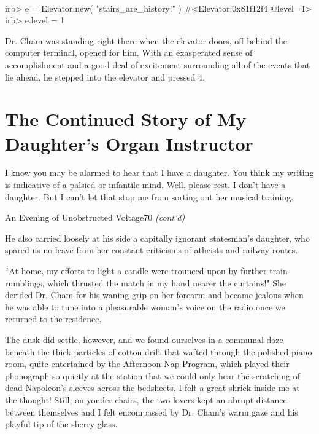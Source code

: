 \documentclass[12pt,twoside]{report}
\begin{document}
\ %
\vspace*{-30pt}

\begin{consolecode}

 irb> e = Elevator.new( "stairs_are_history!" )
 #<Elevator:0x81f12f4 @level=4>
 irb> e.level = 1

\end{consolecode}


Dr. Cham was standing right there when the elevator doors, off behind
the computer terminal, opened for him.  With an exasperated sense of
accomplishment and a good deal of excitement surrounding all of the
events that lie ahead, he stepped into the elevator and pressed 4.

\section{The Continued Story of My Daughter's Organ Instructor}


I know you may be alarmed to hear that I have a daughter.  You think
my writing is indicative of a palsied or infantile mind.  Well, please
rest.  I don't have a daughter. But I can't let that stop me from
sorting out her musical training.


	\begin{sidebar}{An Evening of Unobstructed Voltage}{70}
		\textit{(cont'd)}
	
		\begin{quoting}[rightmargin=0pt,leftmargin=0.5\leftmargin,font=itshape]
			He also carried loosely at his side a capitally ignorant statesman's daughter, who spared us no leave from her constant criticisms of atheists and railway routes.\vspace{6pt}
			
			``At home, my efforts to light a candle were trounced upon by further train rumblings, which thrusted the match in my hand nearer the curtains!" She derided Dr. Cham for his waning grip on her forearm and became jealous when he was able to tune into a pleasurable woman's voice on the radio once we returned to the residence.\vspace{6pt}

			The dusk did settle, however, and we found ourselves in a communal daze beneath the thick particles of cotton drift that wafted through the polished piano room, quite entertained by the Afternoon Nap Program, which played their phonograph so quietly at the station that we could only hear the scratching of dead Napoleon's sleeves across the bedsheets. I felt a great shriek inside me at the thought! Still, on yonder chairs, the two lovers kept an abrupt distance between themselves and I felt encompassed by Dr. Cham's warm gaze and his playful tip of the sherry glass.
		\end{quoting}
	\end{sidebar}
\end{document}
